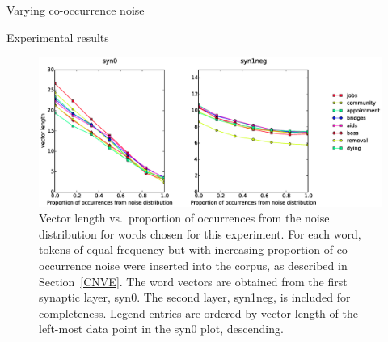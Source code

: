 \documentclass{article} %
\begin{document}
\begin{section}{Varying co-occurrence noise}
\begin{subsection}{Experimental results}
\begin{figure}
	\includegraphics[scale=0.6]{cooccurrence-noise-graph}
	\caption{ Vector length vs.\ proportion of occurrences from the noise distribution
          for words chosen for this experiment.  For each word, tokens
          of equal frequency but with increasing proportion of
          co-occurrence noise were inserted into the corpus, as
          described in Section~\ref{CNVE}.  The word vectors are
          obtained from the first synaptic layer, syn0.  The second
          layer, syn1neg, is included for completeness.  Legend entries
          are ordered by vector length of the left-most data point in
          the syn0 plot, descending.}
	\label{fig:co-occurrence-noise-graph}
\end{figure}

\end{subsection}

\end{section}
\end{document}
